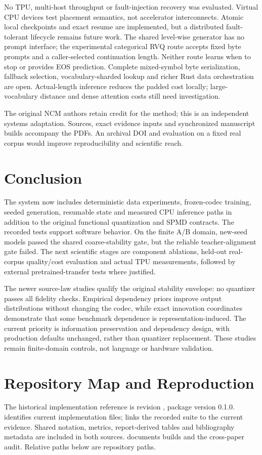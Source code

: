 \documentclass[11pt,a4paper]{article}
\begin{document}
No TPU, multi-host throughput or fault-injection recovery was evaluated.
Virtual CPU devices test placement semantics, not accelerator interconnects.
Atomic local checkpoints and exact resume are implemented, but a distributed
fault-tolerant lifecycle remains future work. The shared level-wise generator
has no prompt interface; the experimental categorical RVQ route accepts fixed
byte prompts and a caller-selected continuation length. Neither route learns
when to stop or provides EOS prediction. Complete mixed-symbol byte
serialization, fallback selection, vocabulary-sharded lookup and richer Rust
data orchestration are open.
Actual-length inference reduces the padded cost locally; large-vocabulary
distance and dense attention costs still need investigation.

The original NCM authors retain credit for the method; this is an independent
systems adaptation. Sources, exact evidence inputs and synchronized manuscript
builds accompany the PDFs. An archival DOI and evaluation on a fixed real corpus
would improve reproducibility and scientific reach.

\section{Conclusion}
The system now includes deterministic data experiments, frozen-codec training,
seeded generation, resumable state and measured CPU inference paths in addition
to the original functional quantization and SPMD contracts. The recorded
\TestCases{} tests support software behavior. On the finite A/B domain,
\StabilityModels{} new-seed models passed the shared coarse-stability gate, but
the reliable teacher-alignment gate failed. The next scientific stages are
component ablations, held-out real-corpus quality/cost evaluation and actual TPU
measurements, followed by external pretrained-transfer tests where justified.

The newer source-law studies qualify the original stability envelope: no
quantizer passes all fidelity checks. Empirical dependency priors improve
output distributions without changing the codec, while exact innovation
coordinates demonstrate that some benchmark dependence is representation-induced.
The current priority is information preservation and dependency design, with
production defaults unchanged, rather than quantizer replacement. These studies
remain finite-domain controls, not language or hardware validation.

\appendix
\section{Repository Map and Reproduction}
\label{app:repro}
The historical implementation reference is revision , package version 0.1.0.
 identifies current implementation files;
 links the recorded suite to the current evidence.
Shared notation, metrics, report-derived tables and bibliography metadata are
included in both sources.  documents builds and the
cross-paper audit. Relative paths below are repository paths.
\end{document}
